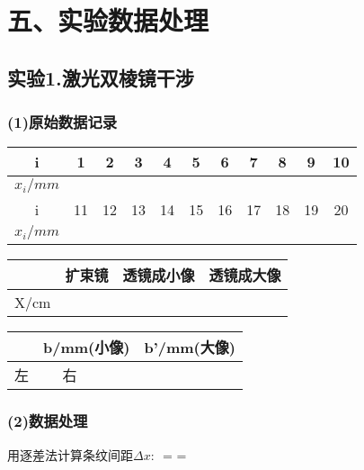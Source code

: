 \section*{五、实验数据处理}
\subsection*{实验1.激光双棱镜干涉}
\subsubsection*{(1)原始数据记录}

\begin{center}
\begin{table}[htbp]
\begin{tabular}{|c|c|c|c|c|c|c|c|c|c|c|}
\hline
i & 1 & 2 & 3 & 4 & 5 & 6 & 7 & 8 & 9 & 10
\\
\hline
$x_i/mm$
{%
{%
&%
{%
{%
\\
\hline
i & 11 & 12 & 13 & 14 & 15 & 16 & 17 & 18 & 19 & 20
\\
\hline
$x_i/mm$
{%
{%
&%
{%
{%
\\
\hline
\end{tabular}
\end{table}
\begin{table}[htbp]
\begin{tabular}{|c|c|c|c|}
\hline
   & 扩束镜 & 透镜成小像 & 透镜成大像 \\
\hline
X/cm
{%
&%
{%
\\
\hline
\end{tabular}
\end{table}
\begin{table}[htbp]
\begin{tabular}{|c|c|c|c|c|}
\hline
 & \multicolumn{2}{|c|}{b/mm(小像) }& \multicolumn{2}{|c|}{b'/mm(大像)} \\
\hline
左 & %
\hline
右 & %
\hline
\end{tabular}
\end{table}
\end{center}

\subsubsection*{(2)数据处理}
用逐差法计算条纹间距${\Delta}x$:
$$ = \displaystyle{} = %

